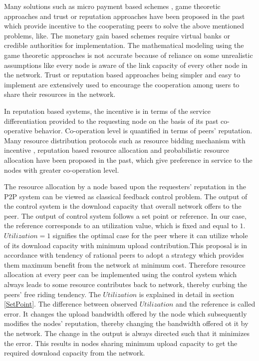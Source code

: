 \documentclass[journal]{IEEEtran}
\begin{document}
Many solutions such as  micro payment based schemes \cite{karma} \cite{bitcoin}, game theoretic approaches  \cite{Feldman}\cite{MaKiGame}\cite{Huiye} and trust or reputation approaches \cite{TrustEstimation}\cite{Satsiou}\cite{Eigen_Trust}\cite{Peer_Trust}\cite{Power_Trust}\cite{Gossip_Trust} have been proposed in the past which provide incentive to the cooperating peers to solve the above mentioned problems, like. The monetary gain based schemes require   virtual banks or credible authorities for implementation. The mathematical modeling using the game theoretic approaches is  not accurate \cite{Satsiou} because of reliance on some unrealistic assumptions like every node is aware of the link capacity of every other node in the network. Trust or reputation based approaches being simpler and easy to implement are extensively used to encourage the cooperation among users to share their resources in the network. 

In reputation based systems, the incentive is in terms of the service differentiation provided to the requesting node on the basis of its past co-operative behavior. Co-operation level is quantified in terms of peers' reputation. Many resource distribution protocols such as resource bidding mechanism with incentive \cite{MaKiGame}, reputation based resource allocation \cite{Satsiou} and probabilistic resource allocation \cite{probabilistic_allocation} have been proposed in the past, which give preference in service  to the nodes with greater co-operation level. 

The resource allocation by a node based upon the requesters' reputation in the P2P system can be viewed as classical feedback control problem. The output of the control system is the download capacity that overall network offers to the peer. The output of control system follows a set point or reference. In our case, the reference corresponds to an utilization value, which is fixed and equal to $1$. $Utilization = 1$ signifies the optimal case for the peer where it can utilize whole of its download capacity with minimum upload contribution.This proposal is in accordance with tendency of rational peers  \cite{Meo} to adopt a strategy which provides them maximum benefit from the network at minimum cost. Therefore resource allocation at every peer can be implemented using the  control system which always leads to some resource contributes back to network, thereby curbing the peers' free riding tendency. The $Utilization$ is explained in detail in section \ref{SetPoint}. The difference between observed $Utilization$ and the reference is called error. It changes the upload bandwidth offered by the node which subsequently modifies the nodes' reputation, thereby changing the bandwidth offered ot it by the network. The change in the output is always directed such that it minimizes the error. This results in nodes sharing minimum upload capacity to get the required download capacity from the network. 
\end{document}
